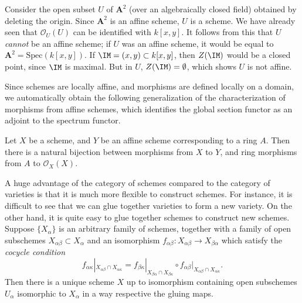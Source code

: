 \begin{example}
    Consider the open subset $U$ of $\mathbf{A}^2$ (over an algebraically closed field) obtained by deleting the origin. Since $\mathbf{A}^2$ is an affine scheme, $U$ is a scheme. We have already seen that $\mathcal{O}_U(U)$ can be identified with $k[x,y]$. It follows from this that $U$ \emph{cannot} be an affine scheme; if $U$ was an affine scheme, it would be equal to $\mathbf{A}^2 = \text{Spec}(k[x,y])$. If $\IM = (x,y) \subset k[x,y]$, then $Z(\IM)$ would be a closed point, since $\IM$ is maximal. But in $U$, $Z(\IM) = \emptyset$, which shows $U$ is not affine.
\end{example}

Since schemes are locally affine, and morphisms are defined locally on a domain, we automatically obtain the following generalization of the characterization of morphisms from affine schemes, which identifies the global section functor as an adjoint to the spectrum functor.

\begin{theorem}
    Let $X$ be a scheme, and $Y$ be an affine scheme corresponding to a ring $A$. Then there is a natural bijection between morphisms from $X$ to $Y$, and ring morphisms from $A$ to $\mathcal{O}_X(X)$.
\end{theorem}

A huge advantage of the category of schemes compared to the category of varieties is that it is much more flexible to construct schemes. For instance, it is difficult to see that we can glue together varieties to form a new variety. On the other hand, it is quite easy to glue together schemes to construct new schemes. Suppose $\{ X_\alpha \}$ is an arbitrary family of schemes, together with a family of open subschemes $X_{\alpha\beta} \subset X_\alpha$ and an isomorphism $f_{\alpha \beta}: X_{\alpha \beta} \to X_{\beta \alpha}$ which satisfy the \emph{cocycle condition}
%
\[ f_{\alpha \kappa}|_{X_{\alpha \beta} \cap X_{\alpha \kappa}} = f_{\beta \kappa}|_{X_{\beta \alpha} \cap X_{\beta \kappa}} \circ f_{\alpha \beta}|_{X_{\alpha \beta} \cap X_{\alpha \kappa}}. \]
%
Then there is a unique scheme $X$ up to isomorphism containing open subschemes $U_\alpha$ isomorphic to $X_\alpha$ in a way respective the gluing maps.

